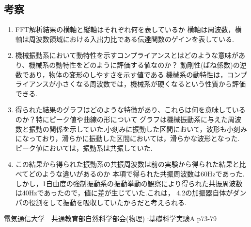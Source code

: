 \documentclass[twocolumn, 10pt,a4j]{jsarticle}
\begin{document}
        \subsection{考察}
          \begin{enumerate}
            \item FFT解析結果の横軸と縦軸はそれぞれ何を表しているか
              横軸は周波数，横軸は周波数領域における入出力比である伝達関数のゲインを表している.
            \item 機械振動系において動特性を示すコンプライアンスとはどのような意味があり、機械系の動特性をどのように評価する値なのか？
              動剛性(ばね係数)の逆数であり，物体の変形のしやすさを示す値である.機械系の動特性は，コンプライアンスが小さくなる周波数では，機械系が硬くなるという性質から評価できる.
            \item 得られた結果のグラフはどのような特徴があり、これらは何を意味しているのか？特にピーク値や曲線の形について
              グラフは機械振動系に与えた周波数と振動の関係を示していた.小刻みに振動した区間において，波形も小刻みになっており，滑らかに振動した区間においては，滑らかな波形となった.
              ピーク値においては，振動系は共振していた.
            \item この結果から得られた振動系の共振周波数は前の実験から得られた結果と比べてどのような違いがあるのか
              本項で得られた共振周波数は60Hzであった.  しかし，1自由度の強制振動系の振動挙動の観察により得られた共振周波数は40Hzであったので，値に差が生じていた.これは，
              4.2の加振器自体がダンパの役割をして振動を吸収していたからだと考えられる.
          \end{enumerate}
        
      
\begin{thebibliography}{3}
\bibitem{}電気通信大学　共通教育部自然科学部会(物理) :基礎科学実験A p73-79
\end{thebibliography}
\end{document}
